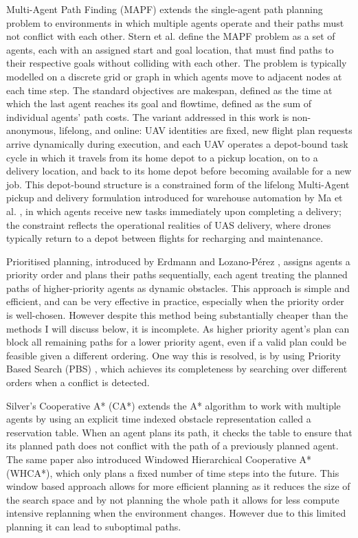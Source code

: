 Multi-Agent Path Finding (MAPF) extends the single-agent path planning problem to environments in which multiple agents operate and their paths must not conflict with each other. Stern et al. \cite{stern2019multi} define the MAPF problem as a set of agents, each with an assigned start and goal location, that must find paths to their respective goals without colliding with each other. The problem is typically modelled on a discrete grid or graph in which agents move to adjacent nodes at each time step. The standard objectives are makespan, defined as the time at which the last agent reaches its goal and flowtime, defined as the sum of individual agents' path costs. The variant addressed in this work is non-anonymous, lifelong, and online: UAV identities are fixed, new flight plan requests arrive dynamically during execution, and each UAV operates a depot-bound task cycle in which it travels from its home depot to a pickup location, on to a delivery location, and back to its home depot before becoming available for a new job. This depot-bound structure is a constrained form of the lifelong Multi-Agent pickup and delivery formulation introduced for warehouse automation by Ma et al. \cite{ma2017lifelong}, in which agents receive new tasks immediately upon completing a delivery; the constraint reflects the operational realities of UAS delivery, where drones typically return to a depot between flights for recharging and maintenance. \par

\vspace{1em}

Prioritised planning, introduced by Erdmann and Lozano-P\'erez \cite{erdmann1987motion}, assigns agents a priority order and plans their paths sequentially, each agent treating the planned paths of higher-priority agents as dynamic obstacles. This approach is simple and efficient, and can be very effective in practice, especially when the priority order is well-chosen. However despite this method being substantially cheaper than the methods I will discuss below, it is incomplete. As higher priority agent's plan can block all remaining paths for a lower priority agent, even if a valid plan could be feasible given a different ordering. One way this is resolved, is by using Priority Based Search (PBS) \cite{ma2019pbs}, which achieves its completeness by searching over different orders when a conflict is detected. \par

Silver's Cooperative A* (CA*) \cite{silver2005cooperative} extends the A* algorithm to work with multiple agents by using an explicit time indexed obstacle representation called a reservation table. When an agent plans its path, it checks the table to ensure that its planned path does not conflict with the path of a previously planned agent. The same paper also introduced Windowed Hierarchical Cooperative A* (WHCA*), which only plans a fixed number of time steps into the future. This window based approach allows for more efficient planning as it reduces the size of the search space and by not planning the whole path it allows for less compute intensive replanning when the environment changes. However due to this limited planning it can lead to suboptimal paths.\par

